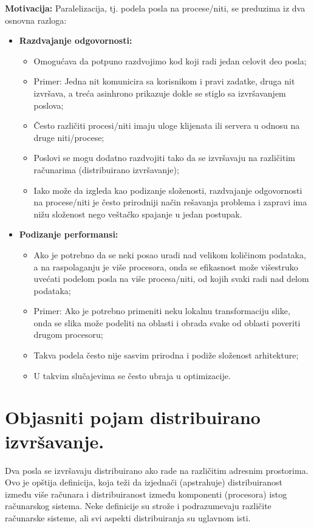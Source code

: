 \documentclass[a4paper]{article}
\begin{document}
  \textbf{Motivacija:} Paralelizacija, tj. podela posla na procese/niti, 
  se preduzima iz dva osnovna razloga:
  \begin{itemize}
    \item \textbf{Razdvajanje odgovornosti:}
      \begin{itemize}
        \item Omogućava da potpuno razdvojimo kod koji radi jedan celovit deo posla;
        \item Primer: Jedna nit komunicira sa korisnikom i pravi zadatke, druga nit izvršava, 
              a treća asinhrono prikazuje dokle se stiglo sa izvršavanjem poslova;
        \item Često različiti procesi/niti imaju uloge klijenata ili servera u odnosu na druge 
              niti/procese;
        \item Poslovi se mogu dodatno razdvojiti tako da se izvršavaju na različitim računarima 
              (distribuirano izvršavanje);
        \item Iako može da izgleda kao podizanje složenosti, razdvajanje odgovornosti na procese/niti 
              je često prirodniji način rešavanja problema i zapravi ima nižu složenost nego 
              veštačko spajanje u jedan postupak.
      \end{itemize}
    \item \textbf{Podizanje performansi:}
      \begin{itemize}
        \item Ako je potrebno da se neki posao uradi nad velikom količinom podataka, 
              a na raspolaganju je više procesora, onda se efikasnost može višestruko uvećati 
              podelom posla na više procesa/niti, od kojih svaki radi nad delom podataka;
        \item Primer: Ako je potrebno primeniti neku lokalnu transformaciju slike, onda se slika može 
              podeliti na oblasti i obrada svake od oblasti poveriti drugom procesoru;
        \item Takva podela često nije sasvim prirodna i podiže složenost arhitekture;
        \item U takvim slučajevima se često ubraja u optimizacije.
      \end{itemize}
  \end{itemize}

\section{Objasniti pojam distribuirano izvršavanje.}
  Dva posla se izvršavaju distribuirano ako rade na različitim adresnim prostorima.
  Ovo je opštija definicija, koja teži da izjednači (apstrahuje) distribuiranost između 
  više računara i distribuiranost između komponenti (procesora) istog računarskog sistema.
  Neke definicije su strože i podrazumevaju različite računarske sisteme, ali 
  svi aspekti distribuiranja su uglavnom isti.
  
\end{document}
